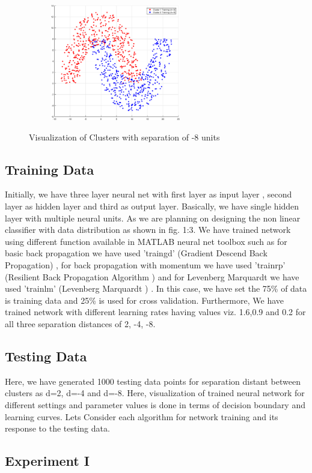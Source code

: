 \documentclass[conference]{IEEEtran}
\begin{document}
\begin{figure}
\centering
{\includegraphics[width=3in,height=2in,clip,keepaspectratio]{ClustersDn8.eps} }\\
\caption{ Visualization of Clusters with separation of -8 units}
\end{figure}
\subsection{Training Data}
Initially, we have three layer neural net with first layer as input layer , second layer as hidden layer and third as output layer. Basically, we have single hidden layer with multiple neural units. As we are planning on designing the non linear classifier with data distribution as shown in fig. 1:3. We have trained network using different function available in MATLAB neural net toolbox  such as for basic back propagation we have used 'traingd' (Gradient Descend Back Propagation)\cite{gd} \cite{mgd}, for back propagation with momentum we have used 'trainrp' (Resilient Back Propagation Algorithm )\cite{gdm} \cite{mgdm}and for Levenberg Marquardt we have used 'trainlm' (Levenberg Marquardt )\cite{lm} \cite{mlm}. In this case, we have set the 75\% of data is training data and 25\% is used for cross validation. Furthermore, We have trained network with different learning rates having values viz. 1.6,0.9 and 0.2  for all three separation distances of 2, -4, -8.

\subsection{Testing Data}
 Here, we have generated 1000 testing data points for separation distant between clusters as d=2, d=-4 and d=-8. Here, visualization of trained neural network for different settings and parameter values is done in terms of decision boundary and learning curves. Lets Consider each algorithm for network training and its response to the  testing data.
\subsection{Experiment I}
\end{document}
